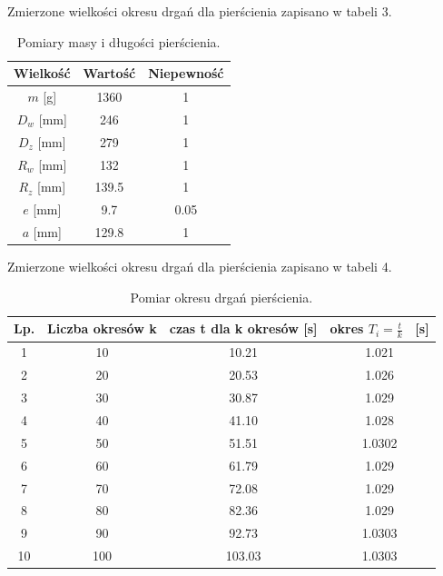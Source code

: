 \documentclass[a4paper,12pts]{article}
\begin{document}
	Zmierzone wielkości okresu drgań dla pierścienia zapisano w tabeli 3.
	
		\begin{table}[!h]
		\centering
		\begin{tabular}{ | c | c | c | }
			\hline
			\textrm{Wielkość} & \textrm{Wartość} & \textrm{Niepewność} \\ \hline
			$m$ [g] & 1360 & 1  \\ \hline
			$D_w$ [mm] & 246 & 1  \\ \hline
			$D_z$ [mm] & 279 & 1  \\ \hline
			$R_w$ [mm]& 132 & 1  \\ \hline
			$R_z$ [mm]& 139.5 & 1  \\ \hline
			$e$ [mm]& 9.7 & 0.05  \\ \hline
			$a$ [mm]& 129.8 & 1  \\ \hline
			
		\end{tabular}
		\caption{Pomiary masy i długości pierścienia.}
		\label{Tabela1}	
	\end{table}
	
	Zmierzone wielkości okresu drgań dla pierścienia zapisano w tabeli 4.
	
	\begin{table}[!h]
		\centering
		\begin{tabular}{ | c | c | c | c | }
			\hline
			\textrm{Lp.} & \textrm{Liczba okresów } k & \textrm{czas } t \textrm{ dla } k \textrm{ okresów [s]} & \textrm{okres } $T_i= \frac{t}{k}$ \textrm{~[s]} \\ \hline
			1 & 10 & 10.21 & 1.021 \\ \hline
			2 & 20 & 20.53 & 1.026 \\ \hline
			3 & 30 & 30.87 & 1.029 \\ \hline
			4 & 40 & 41.10 & 1.028 \\ \hline
			5 & 50 & 51.51 & 1.0302 \\ \hline
			6 & 60 & 61.79 & 1.029 \\ \hline
			7 & 70 & 72.08 & 1.029 \\ \hline
			8 & 80 & 82.36 & 1.029 \\ \hline
			9 & 90 & 92.73 & 1.0303 \\ \hline
			10 & 100 & 103.03 & 1.0303 \\ \hline
		\end{tabular}
		\caption{Pomiar okresu drgań pierścienia.}
		\label{Tabela4}	
	\end{table}
	
\end{document}
